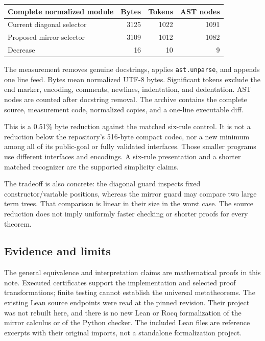 \documentclass[11pt]{article}
\theoremstyle{definition}\newtheorem{definition}[theorem]{Definition}
\begin{document}
\begin{center}
\begin{tabular}{lrrr}
\toprule
Complete normalized module & Bytes & Tokens & AST nodes\\
\midrule
Current diagonal selector & 3125 & 1022 & 1091\\
Proposed mirror selector  & 3109 & 1012 & 1082\\
Decrease                 &   16 &   10 &    9\\
\bottomrule
\end{tabular}
\end{center}

The measurement removes genuine docstrings, applies \texttt{ast.unparse},
and appends one line feed. Bytes mean normalized UTF-8 bytes. Significant
tokens exclude the end marker, encoding, comments, newlines, indentation,
and dedentation. AST nodes are counted after docstring removal. The
archive contains the complete source, measurement code, normalized
copies, and a one-line executable diff.

This is a 0.51\% byte reduction against the matched six-rule control.
It is not a reduction below the repository's 516-byte compact codec,
nor a new minimum among all of its public-goal or fully validated
interfaces. Those smaller programs use different interfaces and
encodings. A six-rule presentation and a shorter matched recognizer
are the supported simplicity claims.

The tradeoff is also concrete: the diagonal guard inspects fixed
constructor/variable positions, whereas the mirror guard may compare
two large term trees. That comparison is linear in their size in the
worst case. The source reduction does not imply uniformly faster
checking or shorter proofs for every theorem.

\subsection{Evidence and limits}

The general equivalence and interpretation claims are mathematical
proofs in this note. Executed certificates support the implementation
and selected proof transformations; finite testing cannot establish
the universal metatheorems. The existing Lean source endpoints were
read at the pinned revision. Their project was not rebuilt here, and
there is no new Lean or Rocq formalization of the mirror calculus or
of the Python checker. The included Lean files are reference excerpts
with their original imports, not a standalone formalization project.
\end{document}

